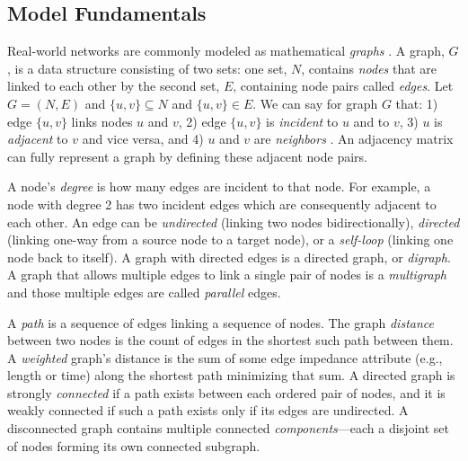 \documentclass[12pt,letterpaper]{article} %
\begin{document}
\subsection{Model Fundamentals}

Real-world networks are commonly modeled as mathematical \textit{graphs} \citep{trudeau_introduction_1994, barthelemy_spatial_2022}. A graph, $G$, is a data structure consisting of two sets: one set, $N$, contains \textit{nodes} that are linked to each other by the second set, $E$, containing node pairs called \textit{edges}. Let $G = (N, E)$ and $\{u, v\} \subseteq N$ and $\{u, v\} \in E$. We can say for graph $G$ that: 1) edge $\{u, v\}$ links nodes $u$ and $v$, 2) edge $\{u, v\}$ is \textit{incident} to $u$ and to $v$, 3) $u$ is \textit{adjacent} to $v$ and vice versa, and 4) $u$ and $v$ are \textit{neighbors} \citep{newman_networks:_2010}. An adjacency matrix can fully represent a graph by defining these adjacent node pairs.

A node's \textit{degree} is how many edges are incident to that node. For example, a node with degree 2 has two incident edges which are consequently adjacent to each other. An edge can be \textit{undirected} (linking two nodes bidirectionally), \textit{directed} (linking one-way from a source node to a target node), or a \textit{self-loop} (linking one node back to itself). A graph with directed edges is a directed graph, or \textit{digraph}. A graph that allows multiple edges to link a single pair of nodes is a \textit{multigraph} and those multiple edges are called \textit{parallel} edges.

A \textit{path} is a sequence of edges linking a sequence of nodes. The graph \textit{distance} between two nodes is the count of edges in the shortest such path between them. A \textit{weighted} graph's distance is the sum of some edge impedance attribute (e.g., length or time) along the shortest path minimizing that sum. A directed graph is strongly \textit{connected} if a path exists between each ordered pair of nodes, and it is weakly connected if such a path exists only if its edges are undirected. A disconnected graph contains multiple connected \textit{components}---each a disjoint set of nodes forming its own connected subgraph.
\end{document}
